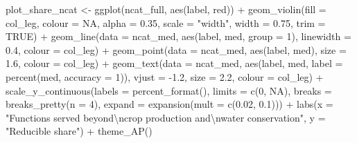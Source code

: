 \documentclass[
  11pt,
]{article}
\newenvironment{Shaded}{\begin{snugshade}}{\end{snugshade}}
\newcommand{\AttributeTok}[1]{\textcolor[rgb]{0.77,0.63,0.00}{#1}}
\newcommand{\ConstantTok}[1]{\textcolor[rgb]{0.00,0.00,0.00}{#1}}
\newcommand{\DecValTok}[1]{\textcolor[rgb]{0.00,0.00,0.81}{#1}}
\newcommand{\FloatTok}[1]{\textcolor[rgb]{0.00,0.00,0.81}{#1}}
\newcommand{\FunctionTok}[1]{\textcolor[rgb]{0.00,0.00,0.00}{#1}}
\newcommand{\NormalTok}[1]{#1}
\newcommand{\OtherTok}[1]{\textcolor[rgb]{0.56,0.35,0.01}{#1}}
\newcommand{\SpecialCharTok}[1]{\textcolor[rgb]{0.00,0.00,0.00}{#1}}
\newcommand{\StringTok}[1]{\textcolor[rgb]{0.31,0.60,0.02}{#1}}
\begin{document}
\begin{Shaded}
\begin{Highlighting}[]
\NormalTok{plot\_share\_ncat }\OtherTok{\textless{}{-}} \FunctionTok{ggplot}\NormalTok{(ncat\_full, }\FunctionTok{aes}\NormalTok{(label, red)) }\SpecialCharTok{+}
  \FunctionTok{geom\_violin}\NormalTok{(}\AttributeTok{fill =}\NormalTok{ col\_leg, }\AttributeTok{colour =} \ConstantTok{NA}\NormalTok{, }\AttributeTok{alpha =} \FloatTok{0.35}\NormalTok{, }\AttributeTok{scale =} \StringTok{"width"}\NormalTok{,}
              \AttributeTok{width =} \FloatTok{0.75}\NormalTok{, }\AttributeTok{trim =} \ConstantTok{TRUE}\NormalTok{) }\SpecialCharTok{+}
  \FunctionTok{geom\_line}\NormalTok{(}\AttributeTok{data =}\NormalTok{ ncat\_med, }\FunctionTok{aes}\NormalTok{(label, med, }\AttributeTok{group =} \DecValTok{1}\NormalTok{), }\AttributeTok{linewidth =} \FloatTok{0.4}\NormalTok{,}
            \AttributeTok{colour =}\NormalTok{ col\_leg) }\SpecialCharTok{+}
  \FunctionTok{geom\_point}\NormalTok{(}\AttributeTok{data =}\NormalTok{ ncat\_med, }\FunctionTok{aes}\NormalTok{(label, med), }\AttributeTok{size =} \FloatTok{1.6}\NormalTok{, }\AttributeTok{colour =}\NormalTok{ col\_leg) }\SpecialCharTok{+}
  \FunctionTok{geom\_text}\NormalTok{(}\AttributeTok{data =}\NormalTok{ ncat\_med, }\FunctionTok{aes}\NormalTok{(label, med, }\AttributeTok{label =} \FunctionTok{percent}\NormalTok{(med, }\AttributeTok{accuracy =} \DecValTok{1}\NormalTok{)),}
            \AttributeTok{vjust =} \SpecialCharTok{{-}}\FloatTok{1.2}\NormalTok{, }\AttributeTok{size =} \FloatTok{2.2}\NormalTok{, }\AttributeTok{colour =}\NormalTok{ col\_leg) }\SpecialCharTok{+}
  \FunctionTok{scale\_y\_continuous}\NormalTok{(}\AttributeTok{labels =} \FunctionTok{percent\_format}\NormalTok{(), }\AttributeTok{limits =} \FunctionTok{c}\NormalTok{(}\DecValTok{0}\NormalTok{, }\ConstantTok{NA}\NormalTok{),}
                     \AttributeTok{breaks =} \FunctionTok{breaks\_pretty}\NormalTok{(}\AttributeTok{n =} \DecValTok{4}\NormalTok{),}
                     \AttributeTok{expand =} \FunctionTok{expansion}\NormalTok{(}\AttributeTok{mult =} \FunctionTok{c}\NormalTok{(}\FloatTok{0.02}\NormalTok{, }\FloatTok{0.1}\NormalTok{))) }\SpecialCharTok{+}
  \FunctionTok{labs}\NormalTok{(}\AttributeTok{x =} \StringTok{"Functions served beyond}\SpecialCharTok{\textbackslash{}n}\StringTok{crop production and}\SpecialCharTok{\textbackslash{}n}\StringTok{water conservation"}\NormalTok{,}
       \AttributeTok{y =} \StringTok{"Reducible share"}\NormalTok{) }\SpecialCharTok{+}
  \FunctionTok{theme\_AP}\NormalTok{()}


\end{Highlighting}
\end{Shaded}
\end{document}
